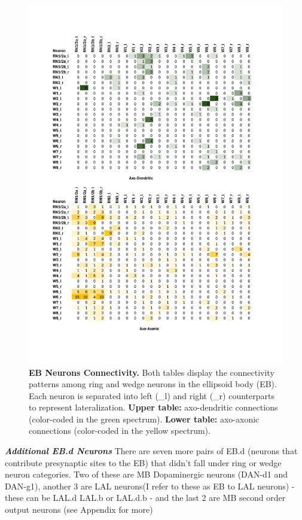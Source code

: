             \begin{figure}[H]
                \centering
                \includegraphics[width=12cm]{Figs/CX/EBneuronsmatrix.pdf}
                \caption{\textbf{EB Neurons Connectivity.} Both tables display the connectivity patterns among ring and wedge neurons in the ellipsoid body (EB). Each neuron is separated into left (\_l) and right (\_r) counterparts to represent lateralization. \textbf{Upper table:} axo-dendritic connections (color-coded in the green spectrum). \textbf{Lower table:} axo-axonic connections (color-coded in the yellow spectrum).}
                \label{EBmatrix}
            \end{figure}

            \textbf{\textit{Additional EB.d Neurons}}
            There are seven more pairs of EB.d (neurons that contribute presynaptic sites to the EB) that didn't fall under ring or wedge neuron categories. Two of these are MB Dopaminergic neurons (DAN-d1 and DAN-g1), another 3 are LAL neurons(I refer to these as EB to LAL neurons) - these can be LAL.d LAL.b or LAL.d.b - and the last 2 are MB second order output neurons (see Appendix for more)%


